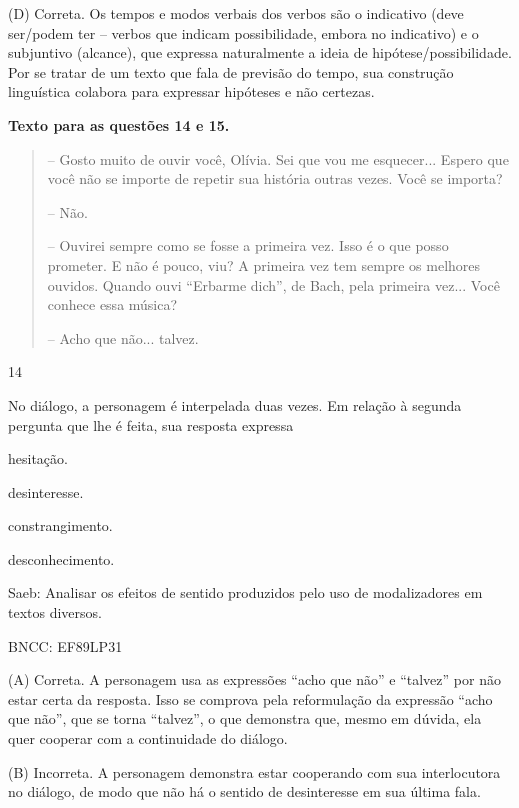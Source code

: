 (D) Correta. Os tempos e modos verbais dos verbos são o indicativo (deve
ser/podem ter -- verbos que indicam possibilidade, embora no indicativo)
e o subjuntivo (alcance), que expressa naturalmente a ideia de
hipótese/possibilidade. Por se tratar de um texto que fala de previsão
do tempo, sua construção linguística colabora para expressar hipóteses e
não certezas.

\textbf{Texto para as questões 14 e 15.}

\begin{quote}
-- Gosto muito de ouvir você, Olívia. Sei que vou me esquecer... Espero
que você não se importe de repetir sua história outras vezes. Você se
importa?

-- Não.

-- Ouvirei sempre como se fosse a primeira vez. Isso é o que posso
prometer. E não é pouco, viu? A primeira vez tem sempre os melhores
ouvidos. Quando ouvi ``Erbarme dich'', de Bach, pela primeira vez...
Você conhece essa música?

-- Acho que não... talvez.
\end{quote}

\num{14}

No diálogo, a personagem é interpelada duas vezes. Em relação à segunda
pergunta que lhe é feita, sua resposta expressa

\begin{escolha}
\item hesitação.

\item desinteresse.

\item constrangimento.

\item desconhecimento.
\end{escolha}

Saeb: Analisar os efeitos de sentido produzidos pelo uso de
modalizadores em textos diversos.

BNCC: EF89LP31

(A) Correta. A personagem usa as expressões ``acho que não'' e
``talvez'' por não estar certa da resposta. Isso se comprova pela
reformulação da expressão ``acho que não'', que se torna ``talvez'', o
que demonstra que, mesmo em dúvida, ela quer cooperar com a continuidade
do diálogo.

(B) Incorreta. A personagem demonstra estar cooperando com sua
interlocutora no diálogo, de modo que não há o sentido de desinteresse
em sua última fala.

